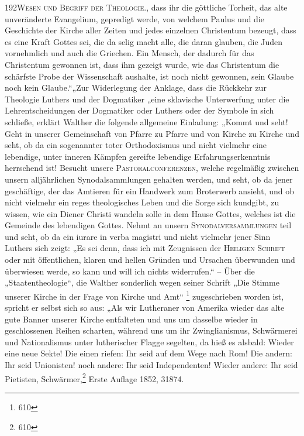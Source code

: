 192\n\textsc{Wesen und Begriff der Theologie.}\n{}, dass ihr die göttliche Torheit, das alte unveränderte Evangelium, gepredigt werde, von welchem Paulus und die Geschichte der Kirche aller Zeiten und jedes einzelnen Christentum bezeugt, dass es eine Kraft Gottes sei, die da selig macht alle, die daran glauben, die Juden vornehmlich und auch die Griechen. Ein Mensch, der dadurch für das Christentum gewonnen ist, dass ihm gezeigt wurde, wie das Christentum die schärfste Probe der Wissenschaft aushalte, ist noch nicht gewonnen, sein Glaube noch kein Glaube.“\n\n„Zur Widerlegung der Anklage, dass die Rückkehr zur Theologie Luthers und der Dogmatiker „eine sklavische Unterwerfung unter die Lehrentscheidungen der Dogmatiker oder Luthers oder der Symbole in sich schließe, erklärt Walther die folgende allgemeine Einladung: „Kommt und seht! Geht in unserer Gemeinschaft von Pfarre zu Pfarre und von Kirche zu Kirche und seht, ob da ein sogenannter toter Orthodoxismus und nicht vielmehr eine lebendige, unter inneren Kämpfen gereifte lebendige Erfahrungserkenntnis herrschend ist! Besucht unsere \textsc{Pastoralconferenzen}, welche regelmäßig zwischen unsern alljährlichen Synodalsammlungen gehalten werden, und seht, ob da jener geschäftige, der das Amtieren für ein Handwerk zum Broterwerb ansieht, und ob nicht vielmehr ein reges theologisches Leben und die Sorge sich kundgibt, zu wissen, wie ein Diener Christi wandeln solle in dem Hause Gottes, welches ist die Gemeinde des lebendigen Gottes. Nehmt an unsern \textsc{Synodalversammlungen} teil und seht, ob da ein iurare in verba magistri und nicht vielmehr jener Sinn Luthers sich zeigt: „Es sei denn, dass ich mit Zeugnissen der \textsc{Heiligen Schrift} oder mit öffentlichen, klaren und hellen Gründen und Ursachen überwunden und überwiesen werde, so kann und will ich nichts widerrufen.“ – Über die „Staatentheologie“, die Walther sonderlich wegen seiner Schrift „Die Stimme unserer Kirche in der Frage von Kirche und Amt“ \footnote{610} zugeschrieben worden ist, spricht er selbst sich so aus: „Als wir Lutheraner von Amerika wieder das alte gute Banner unserer Kirche entfalteten und uns um dasselbe wieder in geschlossenen Reihen scharten, während uns um ihr Zwinglianismus, Schwärmerei und Nationalismus unter lutherischer Flagge segelten, da hieß es alsbald: Wieder eine neue Sekte! Die einen riefen: Ihr seid auf dem Wege nach Rom! Die andern: Ihr seid Unionisten! noch andere: Ihr seid Independenten! Wieder andere: Ihr seid Pietisten, Schwärmer,\n\n\footnote{610} Erste Auflage 1852, 31874.